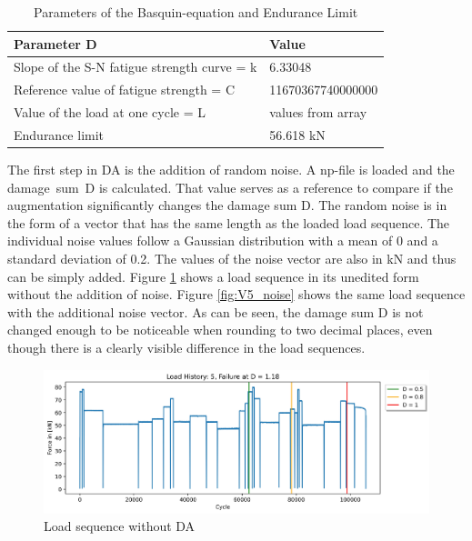 \begin{table}
	\begin{center}
		\begin{tabular}{|| l | l ||}
			\hline
			\rule{0pt}{2ex}Parameter D & Value\\
			\hline
			\hline
			\rule{0pt}{2ex}Slope of the S-N fatigue strength curve = k & 6.33048\\ \hline
			Reference value of fatigue strength = C & 11670367740000000\\	\hline
			Value of the load at one cycle = L & values from array \\ \hline
			Endurance limit & 56.618 kN \\ \hline
		\end{tabular}
		\caption{Parameters of the Basquin-equation and Endurance Limit}
		\label{paramBQ}
	\end{center}
	\vspace{-4mm}
\end{table}

The first step in DA is the addition of random noise. A np-file is loaded and the damage~sum~D is calculated. That value serves as a reference to compare if the augmentation significantly changes the damage sum D.
The random noise is in the form of a vector that has the same length as the loaded load sequence.
The individual noise values follow a Gaussian distribution with a mean of 0 and a standard deviation of 0.2. 
The values of the noise vector are also in kN and thus can be simply added.
Figure \ref{fig:V5} shows a load sequence in its unedited form without the addition of noise. Figure \ref{fig:V5_noise} shows the same load sequence with the additional noise vector. As can be seen, the damage sum D is not changed enough to be noticeable when rounding to two decimal places, even though there is a clearly visible difference in the load sequences.

\begin{figure}[H]
	\centering
	\includegraphics[width=1\linewidth]{IMGs/Verlauf_5.jpg}
	\caption{Load sequence without DA}
	\label{fig:V5}
\end{figure}

